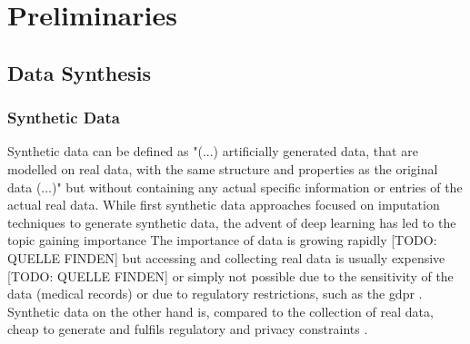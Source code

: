 \chapter{Preliminaries}
\label{ch:preliminaries}

\section{Data Synthesis}
\label{ch:preliminaries-dataSynthesis}

\subsection{Synthetic Data}
\label{ch:preliminaries-dataSynthesis-syntheticData}
Synthetic data can be defined as "(...) artificially generated data, that are modelled on real data, with the same structure and properties as the original data (...)" \cite[p. 2]{kaloskampis2020SyntheticDataCivil} 
but without containing any actual specific information or entries of the actual real data. 
While first synthetic data approaches \cite{gelman1992InferenceIterativeSimulation} focused on imputation techniques to generate synthetic data, the advent of deep learning has led to the topic gaining importance \cite{kowalczyk2022TaxonomyUseSynthetic, kaloskampis2020SyntheticDataCivil}
The importance of data is growing rapidly [TODO: QUELLE FINDEN] but accessing and collecting real data is usually expensive [TODO: QUELLE FINDEN] or simply not possible due to the sensitivity of the data (\eg medical records) \cite{esteban2017RealvaluedMedicalTimea} or due to regulatory restrictions, such as the \gls{gdpr} \cite{european_commission_regulation_2016}.
Synthetic data on the other hand is, compared to the collection of real data, cheap to generate \cite{leminh2021AirGenGANbasedSynthetica} and fulfils regulatory and privacy constraints \cite{zhao2022CTABGANEnhancingTabular}.


